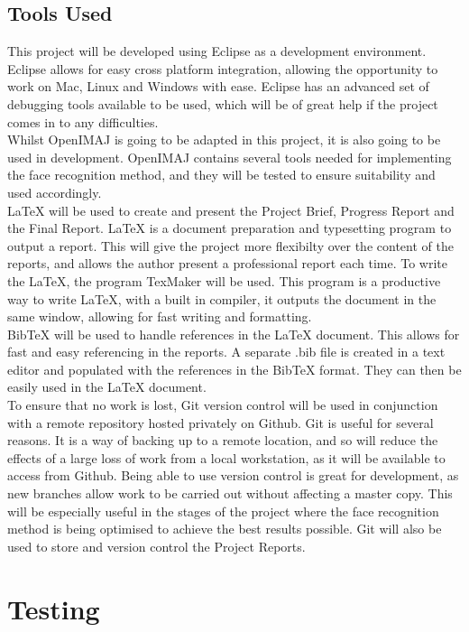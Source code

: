 \documentclass[12pt, a4paper]{article}
\begin{document}
\subsection{Tools Used} 
This project will be developed using Eclipse as a development environment. Eclipse allows for easy cross platform integration, allowing the opportunity to work on Mac, Linux and Windows with ease. Eclipse has an advanced set of debugging tools available to be used, which will be of great help if the project comes in to any difficulties.\\ 
Whilst OpenIMAJ is going to be adapted in this project, it is also going to be used in development. OpenIMAJ contains several tools needed for implementing the face recognition method, and they will be tested to ensure suitability and used accordingly. \\
\LaTeX{} will be used to create and present the Project Brief, Progress Report and the Final Report. \LaTeX{} is a document preparation and typesetting program to output a report. This will give the project more flexibilty over the content of the reports, and allows the author present a professional report each time. To write the \LaTeX{}, the program TexMaker will be used. This program is a productive way to write \LaTeX{}, with a built in compiler, it outputs the document in the same window, allowing for fast writing and formatting.\\
BibTeX will be used to handle references in the \LaTeX{} document. This allows for fast and easy referencing in the reports. A separate .bib file is created in a text editor and populated with the references in the BibTeX format. They can then be easily used in the \LaTeX{} document.\\
To ensure that no work is lost, Git version control will be used in conjunction with a remote repository hosted privately on Github. Git is useful for several reasons. It is a way of backing up to a remote location, and so will reduce the effects of a large loss of work from a local workstation, as it will be available to access from Github. Being able to use version control is great for development, as new branches allow work to be carried out without affecting a master copy. This will be especially useful in the stages of the project where the face recognition method is being optimised to achieve the best results possible. Git will also be used to store and version control the Project Reports.

\section{Testing}
\end{document}
